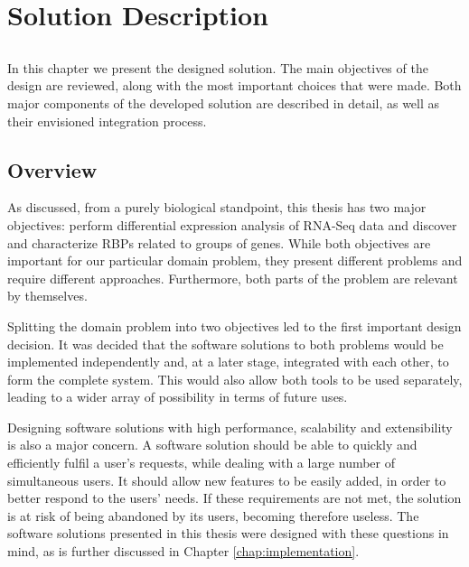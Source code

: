 \chapter{Solution Description} \label{chap:description}

\section*{}

In this chapter we present the designed solution. The main objectives of the
design are reviewed, along with the most important choices that were made. Both
major components of the developed solution are described in detail, as well as
their envisioned integration process.

\section{Overview}


As discussed, from a purely biological standpoint, this thesis has two major
objectives: perform differential expression analysis of RNA-Seq data and
discover and characterize RBPs related to groups of genes. While both objectives
are important for our particular domain problem, they present different problems
and require different approaches. Furthermore, both parts of the problem are
relevant by themselves.

Splitting the domain problem into two objectives led to the first important
design decision. It was decided that the software solutions to both problems
would be implemented independently and, at a later stage, integrated with each
other, to form the complete system. This would also allow both tools to be used
separately, leading to a wider array of possibility in terms of future uses.

Designing software solutions with high performance, scalability and
extensibility is also a major concern. A software solution should be able to
quickly and efficiently fulfil a user's requests, while dealing with a large
number of simultaneous users. It should allow new features to be easily added,
in order to better respond to the users' needs. If these requirements are not
met, the solution is at risk of being abandoned by its users, becoming therefore
useless. The software solutions presented in this thesis were designed with
these questions in mind, as is further discussed in Chapter
\ref{chap:implementation}.

